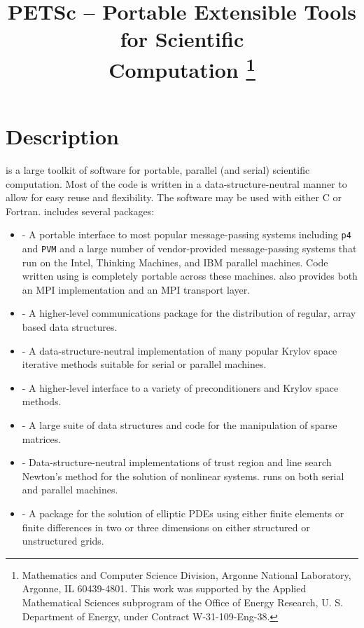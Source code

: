\pagestyle{empty}

\pagestyle{empty}
\title{PETSc -- Portable Extensible Tools for
 Scientific \\Computation
\thanks{Mathematics and Computer Science Division,
Argonne National Laboratory,
Argonne, IL 60439-4801.
This work was supported by the Applied Mathematical
Sciences subprogram of the Office of Energy Research, U. S. Department of
Energy, under Contract W-31-109-Eng-38.}}

\date{}
\maketitle

\section*{Description}

 is a large toolkit of software for portable, 
parallel (and serial) scientific computation. Most of the 
code is written in a data-structure-neutral manner to 
allow for easy reuse and flexibility.
The  software may be used with either C or Fortran.
 includes several packages:
\begin{itemize}
\item {}  - A portable interface to most 
popular message-passing systems including {\tt p4} and {\tt PVM} and 
a large number of vendor-provided message-passing systems
that run on the Intel, Thinking Machines, and IBM parallel 
machines. Code written using  is completely 
portable across these machines.
 also provides both an MPI implementation and an MPI 
transport layer.  
\item {}  - A higher-level communications package
for the distribution of regular, array based data structures.
\item {} - A data-structure-neutral implementation of
many popular Krylov space iterative methods suitable for 
serial or parallel machines.
\item {} - A higher-level interface to a variety
of preconditioners and Krylov space methods.
\item {} - A large suite of data structures and code
for the manipulation of sparse matrices.
\item {} - Data-structure-neutral 
implementations of trust region and line search Newton's 
method for the solution of nonlinear systems.  runs 
on both serial and parallel machines.  
\item {} - A package for the solution of 
elliptic PDEs using either finite elements or finite differences in 
two or three dimensions on either structured or unstructured grids.
\end{itemize}

